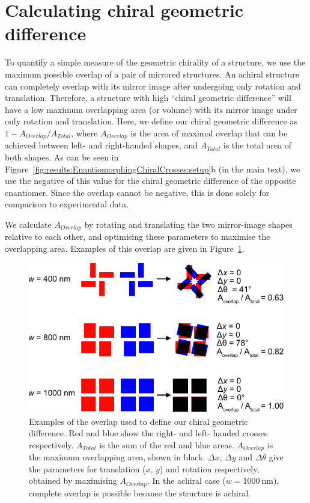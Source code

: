 \section{Calculating chiral geometric difference}\label{sec:appendix:ChiralGeoDiff}

To quantify a simple measure of the geometric chirality of a structure, we use the maximum possible overlap of a pair of mirrored structures. An achiral structure can completely overlap with its mirror image after undergoing only rotation and translation. Therefore, a structure with high ``chiral geometric difference'' will have a low maximum overlapping area (or volume) with its mirror image under only rotation and translation. Here, we define our chiral geometric difference as $1 - A_{Overlap} / A_{Total}$,
where $A_{Overlap}$ is the area of maximal overlap that can be achieved between left- and right-handed shapes, and $A_{Total}$ is the total area of both shapes. 
As can be seen in Figure~\ref{fig:results:EnantiomorphingChiralCrosses:setup}b (in the main text), we use the negative of this value for the chiral geometric difference of the opposite enantiomer. Since the overlap cannot be negative, this is done solely for comparison to experimental data.

We calculate $A_{Overlap}$ by rotating and translating the two mirror-image shapes relative to each other, and optimising these parameters to maximise the overlapping area. Examples of this overlap are given in Figure~\ref{fig:appendix:ChiralGeoDiff}.

\begin{figure}[htb!]	
    \centering	
    \includegraphics[scale=0.8]{./figures/results/EnantiomorphingChiralCrosses/geoDiff.pdf}
    \caption{\label{fig:appendix:ChiralGeoDiff}
    Examples of the overlap used to define our chiral geometric difference. Red and blue show the right- and left- handed crosses respectively.   $A_{Total}$ is the sum of the red and blue areas. $A_{Overlap}$ is the maximum overlapping area, shown in black. $\Delta x$, $\Delta y$ and $\Delta \theta$ give the parameters for translation ($x$, $y$) and rotation respectively, obtained by maximising $A_{Overlap}$. In the achiral case ($w=\SI{1000}{\nano\m}$), complete overlap is possible because the structure is achiral. }	
\end{figure}

